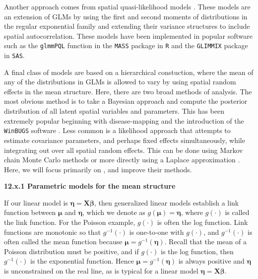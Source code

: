 \documentclass[12pt, titlepage]{article}
\begin{document}
Another approach comes from spatial quasi-likelihood models \citep{breslow_approximate_1993, WolfingerEtAl1993GeneralizedLinearMixed233}. These models are an extension of GLMs by using the first and second moments of distributions in the regular exponential family and extending their variance structures to include spatial autocorrelation.  These models have been implemented in popular software such as the \texttt{glmmPQL} function in the \texttt{MASS} package in \texttt{R} and the \texttt{GLIMMIX} package in \texttt{SAS}.

A final class of models are based on a hierarchical constuction, where the mean of any of the distributions in GLMs is allowed to vary by using spatial random effects in the mean structure.  Here, there are two broad methods of analysis.  The most obvious method is to take a Bayesian approach and compute the posterior distribution of all latent spatial variables and parameters.  This has been extremely popular beginning with disease-mapping \citep{clayton_empirical_1987} and the introduction of the \texttt{WinBUGS} software \citep{lunn_winbugs_2000}. Less common is a likelihood approach that attempts to estimate covariance parameters, and perhaps fixed effects simultaneously, while integrating out over all spatial random effects.   This can be done using Markov chain Monte Carlo methods \citep[e.g.,][]{christensen_monte_2004} or more directly using a Laplace approximation \citep[e.g.,][]{evangelou_estimation_2011, bonat_practical_2016}.  Here, we will focus primarily on \citet{bonat_practical_2016}, and improve their methods.




{\large \flushleft \textbf{12.x.1 Parametric models for the mean structure}}

If our linear model is $\boldsymbol{\eta} = \mathbf{X}\boldsymbol{\beta}$, then generalized linear models establish a link function between $\boldsymbol{\mu}$ and $\boldsymbol{\eta}$, which we denote as $g(\boldsymbol{\mu}) = \boldsymbol{\eta}$, where $g(\cdot)$ is called the link function.  For the Poisson example, $g(\cdot)$ is often the log function.  Link functions are monotonic so that $g^{-1}(\cdot)$ is one-to-one with $g(\cdot)$, and $g^{-1}(\cdot)$ is often called the mean function because $\boldsymbol{\mu} = g^{-1}(\boldsymbol{\eta})$. Recall that the mean of a Poisson distribution must be positive, and if $g(\cdot)$ is the log function, then $g^{-1}(\cdot)$ is the exponential function. Hence $\boldsymbol{\mu} = g^{-1}(\boldsymbol{\eta})$ is always positive and $\boldsymbol{\eta}$ is unconstrained on the real line, as is typical for a linear model $\boldsymbol{\eta} = \mathbf{X}\boldsymbol{\beta}$.
\end{document}
